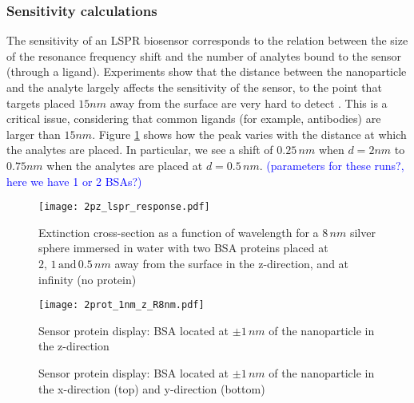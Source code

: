 \subsubsection{Sensitivity calculations} \label{sec:bsa_sensitivity}

The sensitivity of an LSPR biosensor corresponds to the relation between the size of the resonance frequency shift 
and the number of analytes bound to the sensor (through a ligand).
Experiments show that the distance between the nanoparticle and the analyte largely
affects the sensitivity of the sensor, to the point that
targets placed $15nm$ away from the surface are very hard to detect \cite{HaesETal2004}.
This is a critical issue, considering that common ligands (for example, antibodies) are
larger than $15nm$. Figure \ref{fig:dist_response} 
shows how the peak varies with the distance at which the analytes are placed.  
In particular, we see a shift of $0.25 \, nm$ when $d=2 nm$ to $0.75 nm$ when the 
analytes are placed at $d=0.5 \, nm$.
\textcolor{blue}{(parameters for these runs?, here we have 1 or 2 BSAs?)}

\begin{figure}[h] %
   \centering
   \texttt{[image: 2pz\_lspr\_response.pdf]} 
   \caption{Extinction cross-section as a function of wavelength for a $8 \, nm$
            silver sphere immersed in water with two BSA proteins placed at
            $2, \, 1 \, \text{and} \, 0.5 \, nm$ away from the surface in the 
            z-direction, and at infinity (no protein)}
   \label{fig:dist_response}
\end{figure}

\begin{figure*}[] %
   \centering
   \texttt{[image: 2prot\_1nm\_z\_R8nm.pdf]} 
   \caption{Sensor protein display: BSA located at $\pm 1 \, nm$ of the 
            nanoparticle in the z-direction}
   \label{fig:display_z}
\end{figure*}

\begin{figure*}[]

   \centering
    \vfill
    \caption{Sensor protein display: BSA located at $\pm 1 \, nm$ of the nanoparticle in the
            x-direction (top) and y-direction (bottom)}
    \label{fig:display_xy}
\end{figure*}

